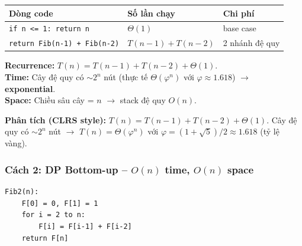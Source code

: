 \documentclass[10pt]{article}
\begin{document}
\begin{tcolorbox}[colback=yellow!5, colframe=orange!50, boxrule=0.5pt, arc=2pt, title={\small\textbf{Phân tích Complexity -- Fibonacci Đệ quy}}]
\begin{tabular}{|l|l|l|}
\hline
\textbf{Dòng code} & \textbf{Số lần chạy} & \textbf{Chi phí} \\
\hline
\texttt{if n <= 1: return n} & $\Theta(1)$ & base case \\
\hline
\texttt{return Fib(n-1) + Fib(n-2)} & $T(n-1)+T(n-2)$ & 2 nhánh đệ quy \\
\hline
\end{tabular}
\vspace{0.2cm}

\textbf{Recurrence:} $T(n) = T(n-1) + T(n-2) + \Theta(1)$.\\
\textbf{Time:} Cây đệ quy có $\sim 2^n$ nút (thực tế $\Theta(\varphi^n)$ với $\varphi\approx1.618$) $\to$ \textbf{exponential}.\\
\textbf{Space:} Chiều sâu cây = $n$ $\to$ stack đệ quy $O(n)$.
\end{tcolorbox}

\textbf{Phân tích (CLRS style):} \(T(n) = T(n-1) + T(n-2) + \Theta(1)\).
Cây đệ quy có \(\sim 2^n\) nút \(\to\) \(T(n) = \Theta(\varphi^n)\) với
\(\varphi = (1+\sqrt{5})/2 \approx 1.618\) (tỷ lệ vàng).

\subsubsection{\texorpdfstring{Cách 2: DP Bottom-up -- \(O(n)\) time,
\(O(n)\)
space}{Cách 2: DP Bottom-up -- O(n) time, O(n) space}}\label{cuxe1ch-2-dp-bottom-up-on-time-on-space}

\begin{tcolorbox}[colback=gray!8, colframe=gray!50, boxrule=0.5pt, arc=2pt,
  left=6pt, right=6pt, top=4pt, bottom=4pt,
  title={\small\textbf{Pseudocode 2: Fibonacci -- DP Bottom-up}}]
\begin{verbatim}
Fib2(n):
    F[0] = 0, F[1] = 1
    for i = 2 to n:
        F[i] = F[i-1] + F[i-2]
    return F[n]
\end{verbatim}
\end{tcolorbox}
\end{document}
